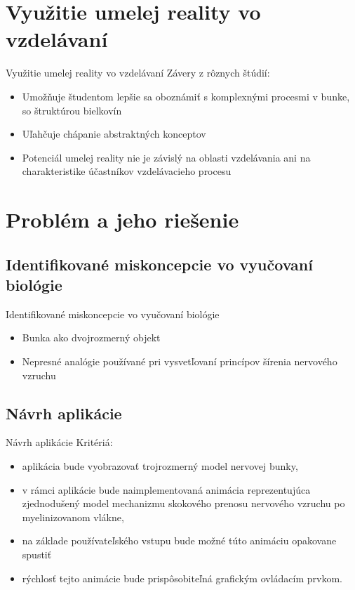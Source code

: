 \documentclass[pdf]{beamer}
\begin{document}
\section{Využitie umelej reality vo vzdelávaní}
\begin{frame}{Využitie umelej reality vo vzdelávaní}
    Závery z rôznych štúdií:
    \begin{itemize}
        \item Umožňuje študentom lepšie sa oboznámiť s komplexnými procesmi v bunke, so štruktúrou bielkovín
        \item Uľahčuje chápanie abstraktných konceptov
        \item Potenciál umelej reality nie je závislý na oblasti vzdelávania ani na charakteristike účastníkov vzdelávacieho procesu
    \end{itemize}
\end{frame}

\section{Problém a jeho riešenie}
\subsection{Identifikované miskoncepcie vo vyučovaní biológie}
\begin{frame}{Identifikované miskoncepcie vo vyučovaní biológie}
    \begin{itemize}
        \item Bunka ako dvojrozmerný objekt \pause
        \item Nepresné analógie používané pri vysvetľovaní princípov šírenia nervového vzruchu
    \end{itemize}
\end{frame}

\subsection{Návrh aplikácie}
\begin{frame}{Návrh aplikácie}
    Kritériá:
        \begin{itemize}
        \item aplikácia bude vyobrazovať trojrozmerný model nervovej bunky,
        \item v rámci aplikácie bude naimplementovaná animácia reprezentujúca zjednodušený model mechanizmu skokového prenosu nervového vzruchu po myelinizovanom vlákne,
        \item na základe používateľského vstupu bude možné túto animáciu opakovane spustiť
        \item rýchlosť tejto animácie bude prispôsobiteľná grafickým ovládacím prvkom.
        \end{itemize}
\end{frame}
\end{document}
